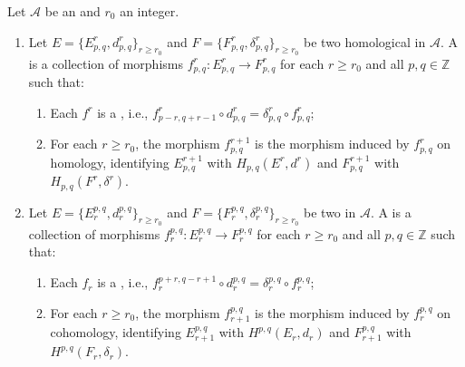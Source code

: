 \begin{definition} \label{definition:morphism_of_spectral_sequences_in_an_abelian_category}
Let $\mathcal{A}$ be an  and $r_0$ an integer.
\begin{enumerate}
    \item Let $E = \{E^r_{p,q}, d^r_{p,q}\}_{r \ge r_0}$ and $F = \{F^r_{p,q}, \delta^r_{p,q}\}_{r \ge r_0}$ be two homological  in $\mathcal{A}$. A  is a collection of morphisms $f^r_{p,q}: E^r_{p,q} \to F^r_{p,q}$ for each $r \ge r_0$ and all $p,q \in \mathbb{Z}$ such that:
    \begin{enumerate}
        \item Each $f^r$ is a , i.e., $f^r_{p-r, q+r-1} \circ d^r_{p,q} = \delta^r_{p,q} \circ f^r_{p,q}$;
        \item For each $r \ge r_0$, the morphism $f^{r+1}_{p,q}$ is the morphism induced by $f^r_{p,q}$ on homology, identifying $E^{r+1}_{p,q}$ with $H_{p,q}(E^r, d^r)$ and $F^{r+1}_{p,q}$ with $H_{p,q}(F^r, \delta^r)$.
    \end{enumerate}
    \item Let $E = \{E_r^{p,q}, d_r^{p,q}\}_{r \ge r_0}$ and $F = \{F_r^{p,q}, \delta_r^{p,q}\}_{r \ge r_0}$ be two  in $\mathcal{A}$. A  is a collection of morphisms $f_r^{p,q}: E_r^{p,q} \to F_r^{p,q}$ for each $r \ge r_0$ and all $p,q \in \mathbb{Z}$ such that:
    \begin{enumerate}
        \item Each $f_r$ is a , i.e., $f_r^{p+r, q-r+1} \circ d_r^{p,q} = \delta_r^{p,q} \circ f_r^{p,q}$;
        \item For each $r \ge r_0$, the morphism $f_{r+1}^{p,q}$ is the morphism induced by $f_r^{p,q}$ on cohomology, identifying $E_{r+1}^{p,q}$ with $H^{p,q}(E_r, d_r)$ and $F_{r+1}^{p,q}$ with $H^{p,q}(F_r, \delta_r)$.
    \end{enumerate}
\end{enumerate}
\end{definition}